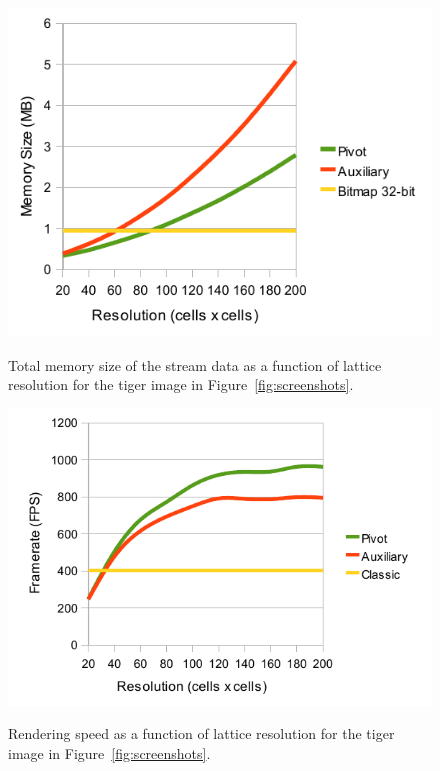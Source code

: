 \documentclass[11pt,a4paper,twoside]{article}
\begin{document}
\begin {figure} [ht]
\centering
\begin {minipage} [b] {0.45\linewidth}
	\centering
	\includegraphics[width=1.0\columnwidth] {figures/graph_grid_memory}
	\caption {Total memory size of the stream data as a function of lattice resolution for the tiger image in Figure~\ref{fig:screenshots}.}
	\label {fig:graph_grid_memory}
\end {minipage}
\hspace{0.5cm}
\begin{minipage} [b] {0.45\linewidth}
	\centering
	\includegraphics[width=1.0\columnwidth] {figures/graph_grid_render}
	\caption {Rendering speed as a function of lattice resolution for the tiger image in Figure~\ref{fig:screenshots}.}
	\label {fig:graph_grid_render}
\end {minipage}
\end {figure}
\end{document}
